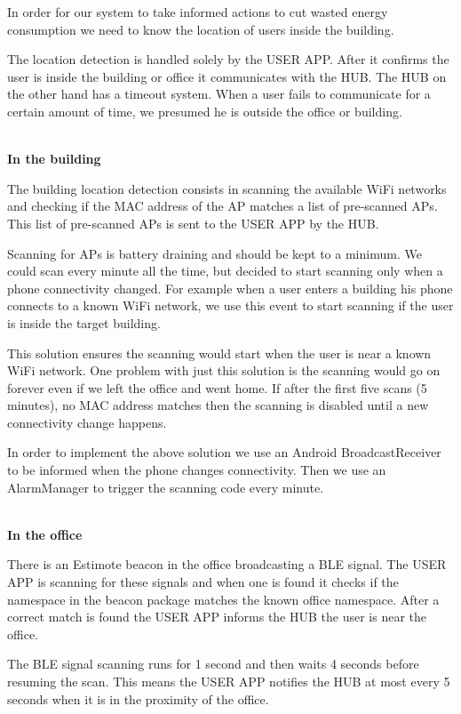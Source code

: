 In order for our system to take informed actions to cut wasted energy consumption we need to know the location of users inside the building.


The location detection is handled solely by the USER APP. After it confirms the user is inside the building or office it communicates with the HUB. The HUB on the other hand has a timeout system. When a user fails to communicate for a certain amount of time, we presumed he is outside the office or building.

\mbox{}\\
\textbf{In the building}

The building location detection consists in scanning the available \ac{WiFi} networks and checking if the \ac{MAC address} of the \ac{AP} matches a list of pre-scanned \ac{AP}s. This list of pre-scanned \ac{AP}s is sent to the USER APP by the HUB.  

Scanning for \ac{AP}s is battery draining and should be kept to a minimum. We could scan every minute all the time, but decided to start scanning only when a phone connectivity changed. For example when a user enters a building his phone connects to a known \ac{WiFi} network, we use this event to start scanning if the user is inside the target building.


This solution ensures the scanning would start when the user is near a known \ac{WiFi} network. One problem with just this solution is the scanning would go on forever even if we left the office and went home. If after the first five scans (5 minutes), no \ac{MAC address} matches then the scanning is disabled until a new connectivity change happens. 


In order to implement the above solution we use an Android BroadcastReceiver to be informed when the phone changes connectivity. Then we use an AlarmManager to trigger the scanning code every minute.

\mbox{}\\
\textbf{In the office}

There is an Estimote beacon in the office broadcasting a \ac{BLE} signal. The USER APP is scanning for these signals and when one is found it checks if the namespace in the beacon package matches the known office namespace. After a correct match is found the USER APP informs the HUB the user is near the office.

The \ac{BLE} signal scanning runs for 1 second and then waits 4 seconds before resuming the scan. This means the USER APP notifies the HUB at most every 5 seconds when it is in the proximity of the office.

